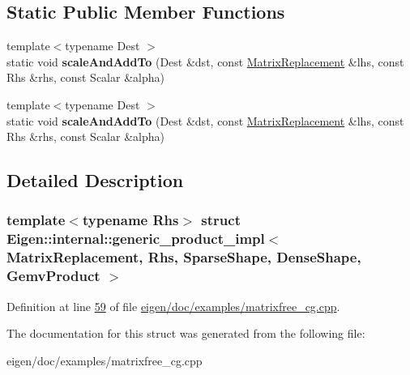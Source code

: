 \subsection*{Static Public Member Functions}
\begin{DoxyCompactItemize}
\item 
\mbox{\label{struct_eigen_1_1internal_1_1generic__product__impl_3_01_matrix_replacement_00_01_rhs_00_01_spars44a334490feb2d22de510ceb99173cfe_aab29b3abf905f2a3a9a59d8752054909}} 
{\footnotesize template$<$typename Dest $>$ }\\static void {\bfseries scale\+And\+Add\+To} (Dest \&dst, const \hyperlink{class_matrix_replacement}{Matrix\+Replacement} \&lhs, const Rhs \&rhs, const Scalar \&alpha)
\item 
\mbox{\label{struct_eigen_1_1internal_1_1generic__product__impl_3_01_matrix_replacement_00_01_rhs_00_01_spars44a334490feb2d22de510ceb99173cfe_aab29b3abf905f2a3a9a59d8752054909}} 
{\footnotesize template$<$typename Dest $>$ }\\static void {\bfseries scale\+And\+Add\+To} (Dest \&dst, const \hyperlink{class_matrix_replacement}{Matrix\+Replacement} \&lhs, const Rhs \&rhs, const Scalar \&alpha)
\end{DoxyCompactItemize}


\subsection{Detailed Description}
\subsubsection*{template$<$typename Rhs$>$\newline
struct Eigen\+::internal\+::generic\+\_\+product\+\_\+impl$<$ Matrix\+Replacement, Rhs, Sparse\+Shape, Dense\+Shape, Gemv\+Product $>$}



Definition at line \hyperlink{eigen_2doc_2examples_2matrixfree__cg_8cpp_source_l00059}{59} of file \hyperlink{eigen_2doc_2examples_2matrixfree__cg_8cpp_source}{eigen/doc/examples/matrixfree\+\_\+cg.\+cpp}.



The documentation for this struct was generated from the following file\+:\begin{DoxyCompactItemize}
\item 
eigen/doc/examples/matrixfree\+\_\+cg.\+cpp\end{DoxyCompactItemize}
